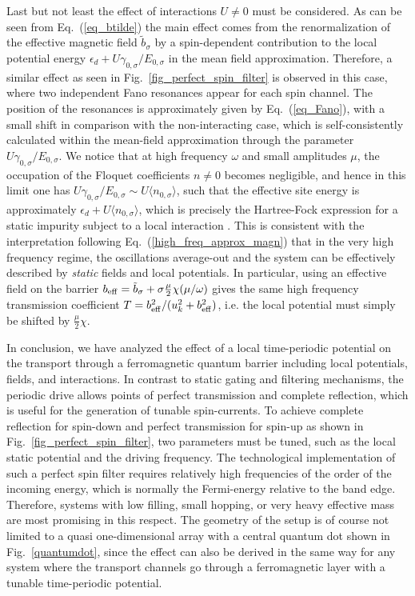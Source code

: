 \documentclass[aps,twocolumn,showpacs,floatfix,prl]{revtex4}
\begin{document}
Last but not least the effect of interactions $U \neq 0$ must be considered.  As can be seen from Eq.~(\ref{eq_btilde}) the main effect comes from
the renormalization of the effective magnetic field $\tilde{b}_{\sigma}$
by a spin-dependent contribution to the local potential energy $\epsilon_d + U\gamma_{0,\sigma}/E_{0,\sigma}$ in the mean field approximation.
Therefore, a similar effect as seen in Fig.~\ref{fig_perfect_spin_filter} is observed in this case, where two independent
Fano resonances appear for each spin channel. The position of the resonances is approximately given by Eq.~(\ref{eq_Fano}), with a small shift in comparison with the non-interacting case, which is self-consistently calculated
within the mean-field approximation through the parameter $U\gamma_{0,\sigma}/E_{0,\sigma}$. We notice that at high frequency $\omega$ 
and small amplitudes $\mu$, the occupation of the Floquet coefficients $n\neq 0$ becomes negligible, 
and hence in this limit one has $U\gamma_{0,\sigma}/E_{0,\sigma} \sim U \langle n_{0,\sigma}\rangle$, such that the effective site energy is approximately $\epsilon_d + U\langle n_{0,\sigma}\rangle$, which is precisely the Hartree-Fock expression
for a static impurity subject to a local interaction \cite{Hewson.93,Hewson}. This is consistent with the interpretation following Eq.~(\ref{high_freq_approx_magn}) that in the very high frequency regime, the oscillations average-out and 
the system can be effectively described by {\it static} fields and local potentials\cite{reyes2017transport,della2007visualization}.  
In particular, using an effective field on the barrier
 $b_{\rm eff} =  \tilde{b}_{\sigma} + \sigma \frac{\mu}{2}\chi(\mu/\omega)$ gives the same high frequency transmission coefficient
$T= b_{\rm eff}^2/(u_k^2 + b_{\rm eff}^2)$, i.e. the local potential must simply be shifted by $\frac{\mu}{2}\chi$.

In conclusion, we have analyzed the effect of a local time-periodic potential on the 
transport through a ferromagnetic quantum barrier including 
local potentials, fields, and interactions.
In contrast to static gating and filtering mechanisms, 
the periodic drive allows points of perfect transmission 
and complete reflection, which is useful for the generation of tunable spin-currents.
To achieve complete reflection for spin-down and perfect transmission for spin-up
as shown in Fig.~\ref{fig_perfect_spin_filter},
 two parameters must be tuned, such as the local static potential and the
driving frequency. 
 The technological implementation of such a perfect
spin filter requires relatively high frequencies
of the order of the incoming energy, which is normally 
the Fermi-energy relative to the band edge.  
Therefore, systems with low filling, small hopping, or very heavy effective
mass are most promising in this respect.   The geometry of the setup is of course not limited to a quasi one-dimensional array with a central quantum dot shown 
in Fig.~\ref{quantumdot}, since the effect can also be derived in the same way for any system where the 
transport channels go through a ferromagnetic layer with a tunable time-periodic potential.
\end{document}
